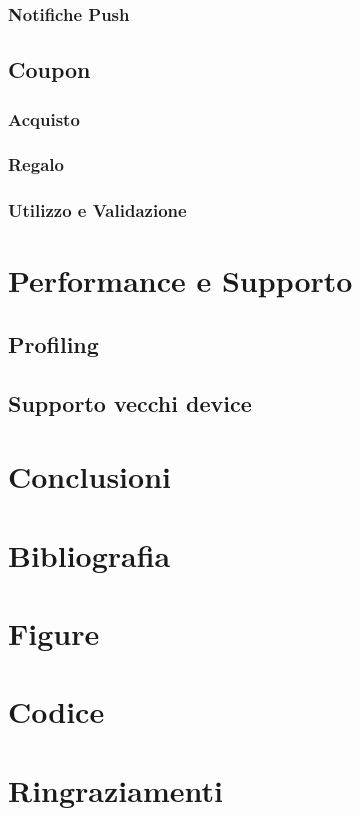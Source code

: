\documentclass{article}
\begin{document}
\subsubsection{Notifiche Push}

\subsection{Coupon}

\subsubsection{Acquisto}

\subsubsection{Regalo}

\subsubsection{Utilizzo e Validazione}

  \newpage
\section{Performance e Supporto}

\subsection{Profiling}

\subsection{Supporto vecchi device}

  \newpage
\section{Conclusioni}

\newpage
\section{Bibliografia}



  \newpage
\section{Figure}

  \newpage
\section{Codice}

  \newpage
\section{Ringraziamenti}
\end{document}

